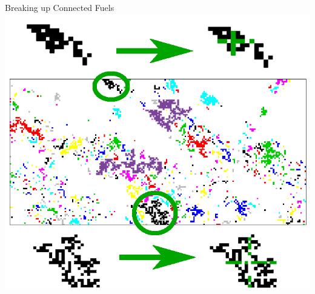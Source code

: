 \documentclass[xcolor=dvipsnames]{beamer}
\begin{document}
\begin{frame}{Breaking up Connected Fuels}
\centering\includegraphics[width=.7\linewidth]{making_connected_graph_picutre.png}
\end{frame}
\end{document}
